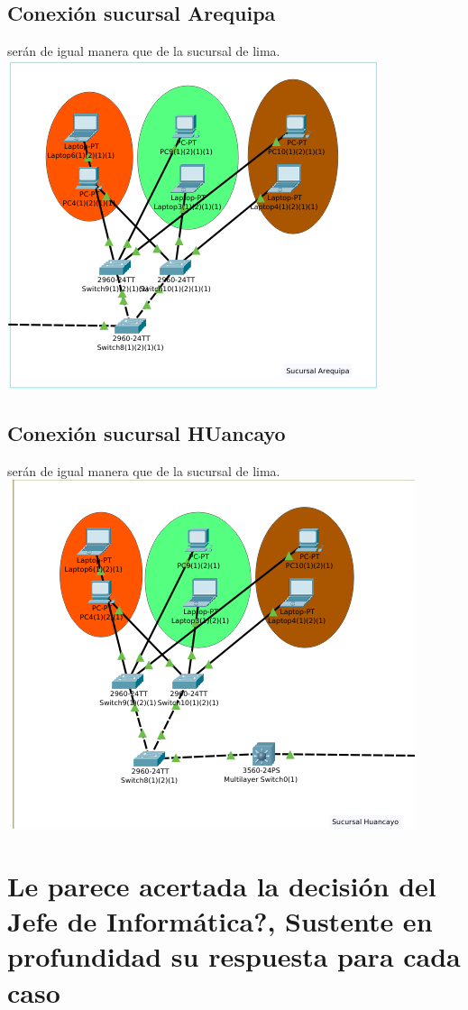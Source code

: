\subsection{Conexi\'on sucursal Arequipa}
ser\'an de igual manera que de la sucursal de lima.
\\
\includegraphics[scale=1]{img/arequipa.png} 
\subsection{Conexi\'on sucursal HUancayo}
ser\'an de igual manera que de la sucursal de lima.
\\
\includegraphics[scale=1]{img/huancayo.png} 

\section{\¿Le parece acertada la decisi\'on del Jefe de Inform\'atica?, Sustente en profundidad su respuesta para cada caso}
